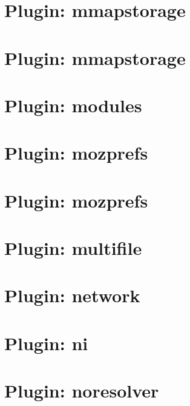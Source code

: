 \let\mypdfximage\pdfximage\def\pdfximage{\immediate\mypdfximage}\documentclass[twoside]{book}
\newcommand{\+}{\discretionary{\mbox{\scriptsize$\hookleftarrow$}}{}{}}
\begin{document}
\chapter{Plugin\+: mmapstorage}
\label{md_src_plugins_mmapstorage_README}

\chapter{Plugin\+: mmapstorage}
\label{md_src_plugins_mmapstorage_shelltests}

\chapter{Plugin\+: modules}
\label{md_src_plugins_modules_README}

\chapter{Plugin\+: mozprefs}
\label{md_src_plugins_mozprefs_autoconfig_README}

\chapter{Plugin\+: mozprefs}
\label{md_src_plugins_mozprefs_README}

\chapter{Plugin\+: multifile}
\label{md_src_plugins_multifile_README}

\chapter{Plugin\+: network}
\label{md_src_plugins_network_README}

\chapter{Plugin\+: ni}
\label{md_src_plugins_ni_README}

\chapter{Plugin\+: noresolver}
\label{md_src_plugins_noresolver_README}

\end{document}
